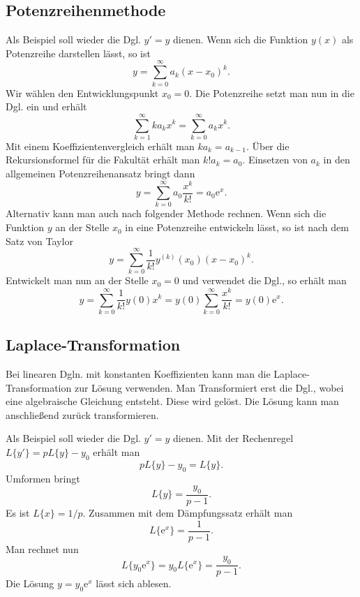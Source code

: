 \documentclass[a4paper,10pt,fleqn,twocolumn,twoside,openany]{scrartcl}
\numberwithin{equation}{section}
\newcommand{\ee}{\mathrm e}
\theoremstyle{definition}
\begin{document}
\subsection{Potenzreihenmethode}

Als Beispiel soll wieder die Dgl. $y'=y$ dienen.
Wenn sich die Funktion $y(x)$ als Potenzreihe darstellen lässt, so ist
\begin{equation}
y=\sum_{k=0}^\infty a_k(x-x_0)^k.
\end{equation}
Wir wählen den Entwicklungspunkt $x_0=0$. Die Potenzreihe setzt man
nun in die Dgl. ein und erhält
\begin{equation}
\sum_{k=1}^\infty ka_kx^k = \sum_{k=0}^\infty a_kx^k.
\end{equation}
Mit einem Koeffizientenvergleich erhält man $ka_k=a_{k-1}$.
Über die Rekursionsformel für die Fakultät erhält man $k!a_k=a_0$.
Einsetzen von $a_k$ in den allgemeinen Potenzreihenansatz bringt dann
\begin{equation}
y=\sum_{k=0}^\infty a_0\frac{x^k}{k!} = a_0\ee^x.
\end{equation}
Alternativ kann man auch nach folgender Methode rechnen.
Wenn sich die Funktion $y$ an der Stelle $x_0$ in eine Potenzreihe
entwickeln lässt, so ist nach dem Satz von Taylor
\begin{equation}
y = \sum_{k=0}^\infty \frac{1}{k!}y^{(k)}(x_0)(x-x_0)^k.
\end{equation}
Entwickelt man nun an der Stelle $x_0=0$ und verwendet die Dgl.,
so erhält man
\begin{equation}
y = \sum_{k=0}^\infty \frac{1}{k!}y(0)x^k
= y(0)\sum_{k=0}^\infty \frac{x^k}{k!}
= y(0)\ee^x.
\end{equation}

\subsection{Laplace-Transformation}

Bei linearen Dgln. mit konstanten Koeffizienten kann man die
Laplace-Transformation zur Lösung verwenden. Man Transformiert
erst die Dgl., wobei eine algebraische Gleichung entsteht. Diese
wird gelöst. Die Lösung kann man anschließend zurück transformieren.

Als Beispiel soll wieder die Dgl. $y'=y$ dienen. Mit der Rechenregel
$L\{y'\} = pL\{y\}-y_0$ erhält man
\begin{equation}
pL\{y\}-y_0 = L\{y\}.
\end{equation}
Umformen bringt
\begin{equation}
L\{y\} = \frac{y_0}{p-1}.
\end{equation}
Es ist $L\{x\} = 1/p$. Zusammen mit dem Dämpfungssatz erhält man
\begin{equation}
L\{\ee^x\} = \frac{1}{p-1}.
\end{equation}
Man rechnet nun
\begin{equation}
L\{y_0\ee^x\} = y_0L\{\ee^x\} = \frac{y_0}{p-1}.
\end{equation}
Die Lösung $y=y_0\ee^x$ lässt sich ablesen.
\end{document}
